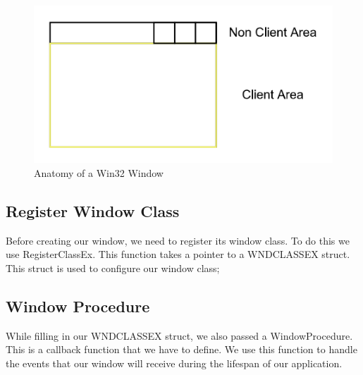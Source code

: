 \begin{figure}[ht]
    \centering
    \includegraphics[scale=0.50]{images/ChInitializingVulkan/Win32Window.png}
    \caption{Anatomy of a Win32 Window}
    \label{fig::Win32Window}
\end{figure}

\begin{minipage}{\linewidth}{\noindent}
    
\end{minipage}

\subsection{Register Window Class}

Before creating our window, we need to register its window class.
To do this we use RegisterClassEx.
This function takes a pointer to a WNDCLASSEX struct.
This struct is used to configure our window class;

\begin{minipage}{\linewidth}{\noindent}
    
\end{minipage}

\subsection{Window Procedure}

While filling in our WNDCLASSEX struct, we also passed a WindowProcedure.
This is a callback function that we have to define.
We use this function to handle the events that our window will receive during
the lifespan of our application.

